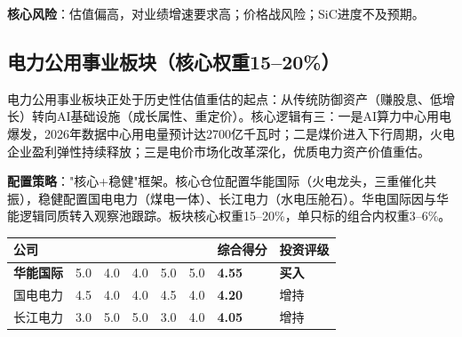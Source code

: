 \textbf{核心风险}：估值偏高，对业绩增速要求高；价格战风险；SiC进度不及预期。

\subsection{电力公用事业板块（核心权重15--20\%）}

电力公用事业板块正处于历史性估值重估的起点：从传统防御资产（赚股息、低增长）转向AI基础设施（成长属性、重定价）。核心逻辑有三：一是AI算力中心用电爆发，2026年数据中心用电量预计达2700亿千瓦时；二是煤价进入下行周期，火电企业盈利弹性持续释放；三是电价市场化改革深化，优质电力资产价值重估。

\textbf{配置策略}："核心+稳健"框架。核心仓位配置华能国际（火电龙头，三重催化共振），稳健配置国电电力（煤电一体）、长江电力（水电压舱石）。华电国际因与华能逻辑同质转入观察池跟踪。板块核心权重15--20\%，单只标的组合内权重3--6\%。

\begin{exhibitbox}
\centering
\scriptsize
\setlength{\tabcolsep}{2pt}

\begin{tabularx}{\linewidth}{X C{1.4cm} C{1.4cm} C{1.4cm} C{1.4cm} C{1.4cm} C{1.4cm} C{1.6cm}}
\toprule
\textbf{公司} & \textbf{} & \textbf{} & \textbf{} & \textbf{} & \textbf{} & \textbf{综合得分} & \textbf{投资评级} \\
\midrule
{}
\textbf{华能国际} & 5.0 & 4.0 & 4.0 & 5.0 & 5.0 & \textbf{4.55} & \textcolor{riskgreen}{\textbf{买入}} \\
\hline
{}
国电电力 & 4.5 & 4.0 & 4.0 & 4.5 & 4.0 & \textbf{4.20} & 增持 \\
长江电力 & 3.0 & 5.0 & 5.0 & 3.0 & 4.0 & \textbf{4.05} & 增持 \\
\bottomrule
\end{tabularx}
\end{exhibitbox}

